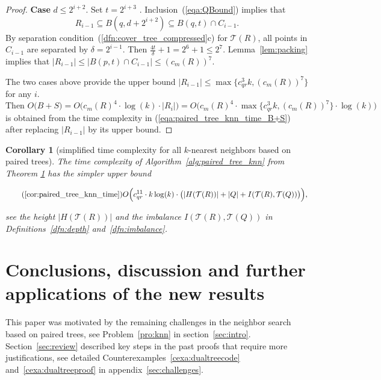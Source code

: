 \documentclass[a4paper,UKenglish,cleveref, autoref]{lipics-v2019}
\numberwithin{algocf}{section}
\theoremstyle{definition}
\theoremstyle{definition}
\theoremstyle{definition}
\theoremstyle{plain}
\newtheorem{cor}[algocf]{Corollary}
\newcommand{\T}{\mathcal{T}}
\begin{document}
\begin{proof}
\noindent
\textbf{Case} $d \leq 2^{i+2}$. 
Set $ t = 2^{i+3}$ . 
Inclusion~(\ref{eqa:QBound}) implies that
$$R_{i-1} \subseteq B(q,d + 2^{i+2}) \subseteq B(q,t) \cap C_{i-1}.$$
By separation condition~(\ref{dfn:cover_tree_compressed}c) for $\T(R)$, all points in $C_{i-1}$ are separated by $\delta = 2^{i-1}$. Then $\frac{4t}{\delta} + 1 = 2^{6} + 1 \leq 2^{7}$.
Lemma~\ref{lem:packing} implies that $|R_{i-1}| \leq |B(p,t) \cap C_{i-1}| \leq (c_m(R))^7$.
\medskip

The two cases above provide the upper bound $|R_{i-1}| \leq \max\{c_{qr}^3 k, (c_{m}(R))^7 \}$ for any $i$. 
\begin{equation*}
\text{Then }O\Big(B + S \Big) =O\Big( c_m(R)^4 \cdot \log(k) \cdot |R_{i}| \Big) = O\Big(c_m(R)^4 \cdot \max\{ c_{qr}^3k ,(c_m(R))^7\}\cdot \log(k)\Big)
\end{equation*}
is obtained from the time complexity in (\ref{eqa:paired_tree_knn_time_B+S}) after replacing $|R_{i-1}|$ by its upper bound.
\end{proof}

\begin{cor}[simplified time complexity for all $k$-nearest neighbors based on paired trees]
\label{cor:paired_tree_knn_time}
The time complexity of Algorithm~\ref{alg:paired_tree_knn} from  Theorem \ref{cor:paired_tree_knn_time} has the simpler upper bound
\begin{ceqn}
\begin{equation}
\tag{\ref{cor:paired_tree_knn_time}}
\label{eqa:cor:ComputationTimeKNN}
 O\Big(c^{11}_{qr} \cdot k\log(k)\cdot \big( |H(\T(R))| + |Q| + I(\T(R),\T(Q)) \big) \Big ),
\end{equation}
\end{ceqn}
see the height $|H(\T(R))|$ and the imbalance $I(\T(R),\T(Q))$ in Definitions~\ref{dfn:depth} and~\ref{dfn:imbalance}.
\end{cor}

\section{Conclusions, discussion and further applications of the new results}
\label{sec:Conclusions}

This paper was motivated by the remaining challenges in the neighbor search based on paired trees, see Problem~\ref{pro:knn} in section~\ref{sec:intro}. 
Section~\ref{sec:review} described key steps in the past proofs that require more justifications, see detailed Counterexamples~\ref{cexa:dualtreecode} and~\ref{cexa:dualtreeproof} in appendix~\ref{sec:challenges}.
\medskip
\end{document}
